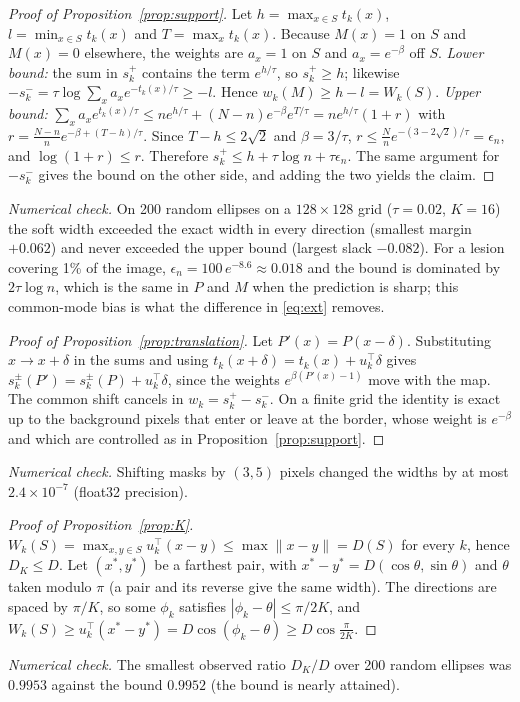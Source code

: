 \documentclass{midl}
\begin{document}
\begin{proof}[Proof of Proposition~\ref{prop:support}]
Let $h=\max_{x\in S}t_k(x)$, $l=\min_{x\in S}t_k(x)$ and $T=\max_xt_k(x)$. Because $M(x)=1$ on $S$ and $M(x)=0$ elsewhere, the weights are $a_x=1$ on $S$ and $a_x=e^{-\beta}$ off $S$. \emph{Lower bound:} the sum in $s_k^{+}$ contains the term $e^{h/\tau}$, so $s_k^{+}\ge h$; likewise $-s_k^{-}=\tau\log\sum_xa_xe^{-t_k(x)/\tau}\ge-l$. Hence $w_k(M)\ge h-l=W_k(S)$. \emph{Upper bound:} $\sum_xa_xe^{t_k(x)/\tau}\le ne^{h/\tau}+(N-n)e^{-\beta}e^{T/\tau}=ne^{h/\tau}(1+r)$ with $r=\frac{N-n}{n}e^{-\beta+(T-h)/\tau}$. Since $T-h\le2\sqrt2$ and $\beta=3/\tau$, $r\le\frac{N}{n}e^{-(3-2\sqrt2)/\tau}=\epsilon_n$, and $\log(1+r)\le r$. Therefore $s_k^{+}\le h+\tau\log n+\tau\epsilon_n$. The same argument for $-s_k^{-}$ gives the bound on the other side, and adding the two yields the claim.
\end{proof}

\emph{Numerical check.} On 200 random ellipses on a $128\times128$ grid ($\tau=0.02$, $K=16$) the soft width exceeded the exact width in every direction (smallest margin $+0.062$) and never exceeded the upper bound (largest slack $-0.082$). For a lesion covering 1\% of the image, $\epsilon_n=100\,e^{-8.6}\approx0.018$ and the bound is dominated by $2\tau\log n$, which is the same in $P$ and $M$ when the prediction is sharp; this common-mode bias is what the difference in \eqref{eq:ext} removes.

\begin{proof}[Proof of Proposition~\ref{prop:translation}]
Let $P'(x)=P(x-\delta)$. Substituting $x\to x+\delta$ in the sums and using $t_k(x+\delta)=t_k(x)+u_k^\top\delta$ gives $s_k^{\pm}(P')=s_k^{\pm}(P)+u_k^\top\delta$, since the weights $e^{\beta(P'(x)-1)}$ move with the map. The common shift cancels in $w_k=s_k^{+}-s_k^{-}$. On a finite grid the identity is exact up to the background pixels that enter or leave at the border, whose weight is $e^{-\beta}$ and which are controlled as in Proposition~\ref{prop:support}.
\end{proof}
\emph{Numerical check.} Shifting masks by $(3,5)$ pixels changed the widths by at most $2.4\times10^{-7}$ (float32 precision).

\begin{proof}[Proof of Proposition~\ref{prop:K}]
$W_k(S)=\max_{x,y\in S}u_k^\top(x-y)\le\max\|x-y\|=D(S)$ for every $k$, hence $D_K\le D$. Let $(x^\ast,y^\ast)$ be a farthest pair, with $x^\ast-y^\ast=D(\cos\theta,\sin\theta)$ and $\theta$ taken modulo $\pi$ (a pair and its reverse give the same width). The directions are spaced by $\pi/K$, so some $\phi_k$ satisfies $|\phi_k-\theta|\le\pi/2K$, and $W_k(S)\ge u_k^\top(x^\ast-y^\ast)=D\cos(\phi_k-\theta)\ge D\cos\frac{\pi}{2K}$.
\end{proof}
\emph{Numerical check.} The smallest observed ratio $D_K/D$ over 200 random ellipses was $0.9953$ against the bound $0.9952$ (the bound is nearly attained).
\end{document}
